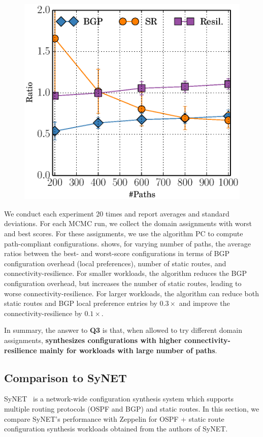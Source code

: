 \begin{figure}
\vspace{-5.5mm}
	\includegraphics[width=0.48\columnwidth]{figures/ratioMCMC.eps}
	\vspace{-3mm}
\end{figure}
We conduct each experiment 20 times and report averages and standard
deviations.  For each MCMC run, we collect the domain assignments with
worst and best scores.  For these assignments, we use the algorithm PC
to compute path-compliant configurations.
 shows, for varying number of paths, the average ratios
between the best- and worst-score configurations
in terms of
BGP configuration overhead (local preferences), 
number of static routes, and 
connectivity-resilience.
For smaller workloads, 
the algorithm reduces the BGP configuration overhead, but increases
the number of static routes, leading to worse connectivity-resilience. For 
larger workloads, the algorithm can
reduce both static routes 
and BGP local preference entries by $0.3\times$
and improve the connectivity-resilience 
by $0.1\times$.

In summary, the answer to \textbf{Q3} is that,
when allowed to try different domain assignments,
\textbf{\name synthesizes configurations with higher connectivity-resilience mainly for workloads with large number of paths}.

\subsection{Comparison to SyNET}
\label{sec:synet}
SyNET~\cite{synet} is a network-wide configuration synthesis system 
which supports multiple routing protocols (OSPF and BGP) and static 
routes. In this section, we compare SyNET's performance with Zeppelin 
for OSPF + static route configuration synthesis workloads obtained from the 
authors of SyNET.

